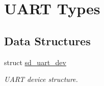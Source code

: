 \hypertarget{group___s_d___u_a_r_t___types}{}\section{U\+A\+RT Types}
\label{group___s_d___u_a_r_t___types}
\subsection*{Data Structures}
\begin{DoxyCompactItemize}
\item 
struct \mbox{\hyperlink{structsd__uart__dev}{sd\+\_\+uart\+\_\+dev}}
\begin{DoxyCompactList}\small\item\em U\+A\+RT device structure. \end{DoxyCompactList}\end{DoxyCompactItemize}
